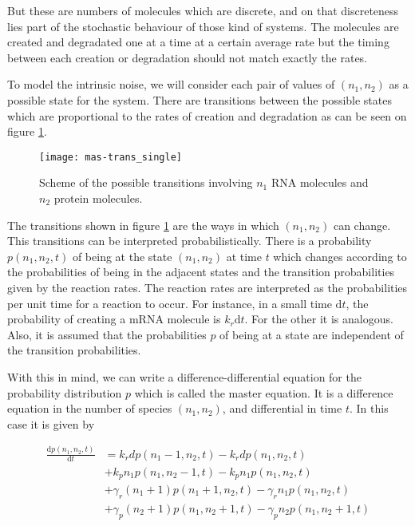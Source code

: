 But these are numbers of molecules which are discrete, and on that discreteness lies part of the stochastic behaviour of those kind of systems. The molecules are created and degradated one at a time at a certain average rate but the timing between each creation or degradation should not match exactly the rates. 

To model the intrinsic noise, we will consider each pair of values of $(n_1,n_2)$ as a possible state for the system. There are transitions between the possible states which are proportional to the rates of creation and degradation as can be seen on figure \ref{fig:mas-trans_single}.

\begin{figure}[H]
  \centering
  \texttt{[image: mas-trans\_single]}
  \caption[Transitions between states for a single gene]{\label{fig:mas-trans_single} Scheme of the possible transitions involving $n_1$ RNA molecules and $n_2$ protein molecules.}
\end{figure}

The transitions shown in figure \ref{fig:mas-trans_single} are the ways in which $(n_1,n_2)$ can change. This transitions can be interpreted probabilistically. There is a probability $p(n_1,n_2,t)$ of being at the state $(n_1,n_2)$ at time $t$ which changes according to the probabilities of being in the adjacent states and the transition probabilities given by the reaction rates. The reaction rates are interpreted as the probabilities per unit time for a reaction to occur. For instance, in a small time $\mathrm{d}t$, the probability of creating a mRNA molecule is $k_r\mathrm{d}t$. For the other it is analogous. Also, it is assumed that the probabilities $p$ of being at a state are independent of the transition probabilities.

With this in mind, we can write a difference-differential equation for the probability distribution $p$ which is called the master equation. It is a difference equation in the number of species $(n_1,n_2)$, and differential in time $t$. In this case it is given by

\begin{equation}
  \label{eq:master}
  \begin{split}
    \frac{\mathrm{d}p(n_1,n_2,t)}{\mathrm{d}t} &= k_rdp(n_1-1,n_2,t) - k_rdp(n_1,n_2,t)\\
&+ k_pn_1p(n_1,n_2-1,t) - k_pn_1p(n_1,n_2,t)\\
&+ \gamma_r(n_1+1)p(n_1+1,n_2,t) - \gamma_rn_1p(n_1,n_2,t)\\
&+ \gamma_p(n_2+1)p(n_1,n_2+1,t) - \gamma_pn_2p(n_1,n_2+1,t)
  \end{split}
\end{equation}

